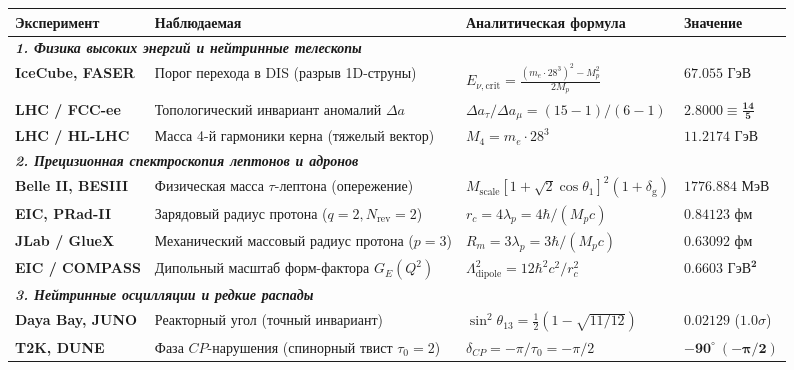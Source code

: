 \documentclass[12pt,a4paper]{article}
\begin{document}
	\begin{table}[H]
		\centering
		\footnotesize
		\setlength{\tabcolsep}{3pt}       %
		\renewcommand{\arraystretch}{1.15} %
		\begin{tabularx}{\textwidth}{p{2.8cm} p{4.6cm} p{4.6cm} >{\raggedleft\arraybackslash}X}
			\toprule
			\textbf{Эксперимент} & \textbf{Наблюдаемая} & \textbf{Аналитическая формула} & \textbf{Значение} \\
			\midrule
			\multicolumn{4}{l}{\textit{\textbf{1. Физика высоких энергий и нейтринные телескопы}}} \\
			\textbf{IceCube, FASER} & Порог перехода в DIS (разрыв 1D-струны) & $E_{\nu, \text{crit}} = \frac{(m_e \cdot 28^3)^2 - M_p^2}{2M_p}$ & $\mathbf{67.055 \text{ ГэВ}}$ \\
			\textbf{LHC / FCC-ee} & Топологический инвариант аномалий $\Delta a$ & $\Delta a_\tau / \Delta a_\mu = (15 - 1)/(6 - 1)$ & $\mathbf{2.8000 \equiv \frac{14}{5}}$ \\
			\textbf{LHC / HL-LHC} & Масса 4-й гармоники керна (тяжелый вектор) & $M_4 = m_e \cdot 28^3$ & $\mathbf{11.2174 \text{ ГэВ}}$ \\
			\midrule
			\multicolumn{4}{l}{\textit{\textbf{2. Прецизионная спектроскопия лептонов и адронов}}} \\
			\textbf{Belle II, BESIII} & Физическая масса $\tau$-лептона (опережение) & $M_{\text{scale}} [1+\sqrt{2}\cos\theta_1]^2 (1+\delta_{\text{g}})$ & $\mathbf{1776.884 \text{ МэВ}}$ \\
			\textbf{EIC, PRad-II} & Зарядовый радиус протона ($q=2, N_{\text{rev}}=2$) & $r_c = 4\lambda_p = 4\hbar / (M_p c)$ & $\mathbf{0.84123 \text{ фм}}$ \\
			\textbf{JLab / GlueX} & Механический массовый радиус протона ($p=3$) & $R_m = 3\lambda_p = 3\hbar / (M_p c)$ & $\mathbf{0.63092 \text{ фм}}$ \\
			\textbf{EIC / COMPASS} & Дипольный масштаб форм-фактора $G_E(Q^2)$ & $\Lambda_{\text{dipole}}^2 = 12\hbar^2 c^2 / r_c^2$ & $\mathbf{0.6603 \text{ ГэВ}^2}$ \\
			\midrule
			\multicolumn{4}{l}{\textit{\textbf{3. Нейтринные осцилляции и редкие распады}}} \\
			\textbf{Daya Bay, JUNO} & Реакторный угол (точный инвариант) & $\sin^2\theta_{13} = \frac{1}{2}(1 - \sqrt{11/12})$ & $\mathbf{0.02129}$ ($1.0\sigma$) \\
			\textbf{T2K, DUNE} & Фаза $CP$-нарушения (спинорный твист $\tau_0=2$) & $\delta_{CP} = -\pi / \tau_0 = -\pi/2$ & $\mathbf{-90^\circ \ (-\pi/2)}$ \\

\end{tabularx}
\end{table}
\end{document}

